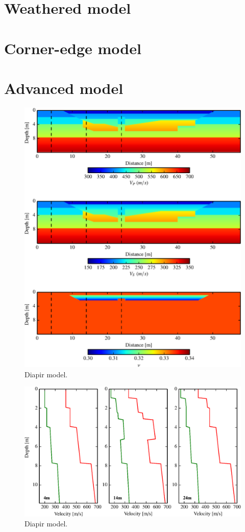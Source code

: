 \documentclass{gnulike}
\begin{document}
\section{Weathered model}

\section{Corner-edge model}

\section{Advanced model}

\begin{figure}[!ht]
  \centering
  \includegraphics[width=0.9\columnwidth]{fig/perez_model.eps}
  \caption{Diapir model. \cite{solano2014alternative}}
  \label{fig:perez_model}
\end{figure}

\begin{figure}[!ht]
  \centering
  \includegraphics[width=0.9\columnwidth]{fig/perez_model_profile.eps}
  \caption{Diapir model.}
  \label{fig:perez_model}
\end{figure}
\end{document}
